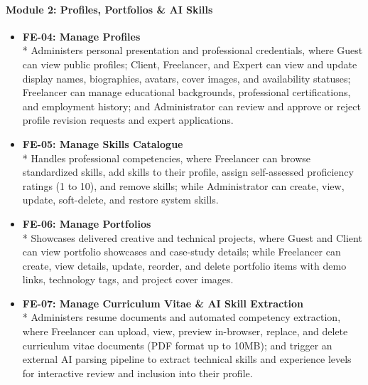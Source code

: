 \paragraph*{Module 2: Profiles, Portfolios \& AI Skills}
\begin{itemize}[leftmargin=1.0cm, label=--]

\item \textbf{FE-04: Manage Profiles} \\*
Administers personal presentation and professional credentials, where Guest can view public profiles; Client, Freelancer, and Expert can view and update display names, biographies, avatars, cover images, and availability statuses; Freelancer can manage educational backgrounds, professional certifications, and employment history; and Administrator can review and approve or reject profile revision requests and expert applications.

\item \textbf{FE-05: Manage Skills Catalogue} \\*
Handles professional competencies, where Freelancer can browse standardized skills, add skills to their profile, assign self-assessed proficiency ratings (1 to 10), and remove skills; while Administrator can create, view, update, soft-delete, and restore system skills.

\item \textbf{FE-06: Manage Portfolios} \\*
Showcases delivered creative and technical projects, where Guest and Client can view portfolio showcases and case-study details; while Freelancer can create, view details, update, reorder, and delete portfolio items with demo links, technology tags, and project cover images.

\item \textbf{FE-07: Manage Curriculum Vitae \& AI Skill Extraction} \\*
Administers resume documents and automated competency extraction, where Freelancer can upload, view, preview in-browser, replace, and delete curriculum vitae documents (PDF format up to 10MB); and trigger an external AI parsing pipeline to extract technical skills and experience levels for interactive review and inclusion into their profile.

\end{itemize}

